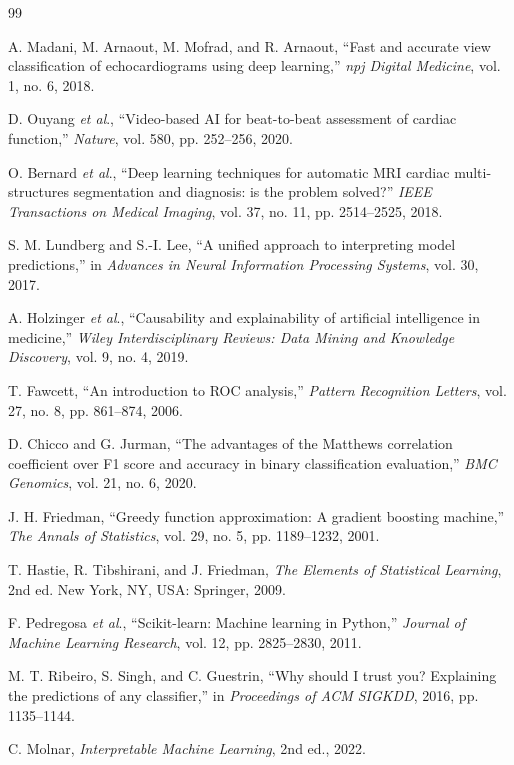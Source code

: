 \documentclass[10pt,twocolumn,letterpaper]{IEEEtran}
\begin{document}
\begin{thebibliography}{99}

A. Madani, M. Arnaout, M. Mofrad, and R. Arnaout, ``Fast and accurate view classification of echocardiograms using deep learning,'' \textit{npj Digital Medicine}, vol. 1, no. 6, 2018.

D. Ouyang \textit{et al}., ``Video-based AI for beat-to-beat assessment of cardiac function,'' \textit{Nature}, vol. 580, pp. 252--256, 2020.

O. Bernard \textit{et al}., ``Deep learning techniques for automatic MRI cardiac multi-structures segmentation and diagnosis: is the problem solved?'' \textit{IEEE Transactions on Medical Imaging}, vol. 37, no. 11, pp. 2514--2525, 2018.

S. M. Lundberg and S.-I. Lee, ``A unified approach to interpreting model predictions,'' in \textit{Advances in Neural Information Processing Systems}, vol. 30, 2017.

A. Holzinger \textit{et al}., ``Causability and explainability of artificial intelligence in medicine,'' \textit{Wiley Interdisciplinary Reviews: Data Mining and Knowledge Discovery}, vol. 9, no. 4, 2019.

T. Fawcett, ``An introduction to ROC analysis,'' \textit{Pattern Recognition Letters}, vol. 27, no. 8, pp. 861--874, 2006.

D. Chicco and G. Jurman, ``The advantages of the Matthews correlation coefficient over F1 score and accuracy in binary classification evaluation,'' \textit{BMC Genomics}, vol. 21, no. 6, 2020.

J. H. Friedman, ``Greedy function approximation: A gradient boosting machine,'' \textit{The Annals of Statistics}, vol. 29, no. 5, pp. 1189--1232, 2001.

T. Hastie, R. Tibshirani, and J. Friedman, \textit{The Elements of Statistical Learning}, 2nd ed. New York, NY, USA: Springer, 2009.

F. Pedregosa \textit{et al}., ``Scikit-learn: Machine learning in Python,'' \textit{Journal of Machine Learning Research}, vol. 12, pp. 2825--2830, 2011.

M. T. Ribeiro, S. Singh, and C. Guestrin, ``Why should I trust you? Explaining the predictions of any classifier,'' in \textit{Proceedings of ACM SIGKDD}, 2016, pp. 1135--1144.

C. Molnar, \textit{Interpretable Machine Learning}, 2nd ed., 2022.

\end{thebibliography}
\end{document}

